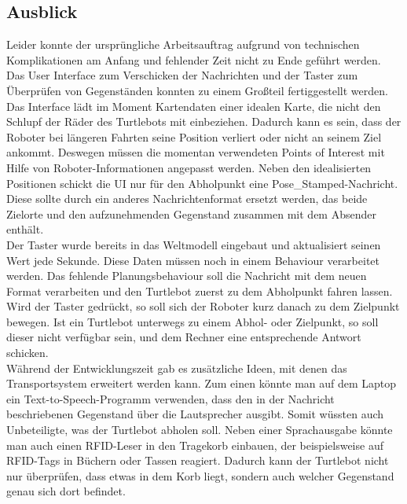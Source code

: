 \documentclass[a4paper,12pt,headsepline]{scrartcl}
\begin{document}
	\subsection{Ausblick}
		Leider konnte der ursprüngliche Arbeitsauftrag aufgrund von technischen Komplikationen am Anfang und fehlender Zeit nicht zu Ende geführt werden. Das User Interface zum Verschicken der Nachrichten und der Taster zum Überprüfen von Gegenständen konnten zu einem Großteil fertiggestellt werden.\\
		Das Interface lädt im Moment Kartendaten einer idealen Karte, die nicht den Schlupf der Räder des Turtlebots mit einbeziehen. Dadurch kann es sein, dass der Roboter bei längeren Fahrten seine Position verliert oder nicht an seinem Ziel ankommt. Deswegen müssen die momentan verwendeten Points of Interest mit Hilfe von Roboter-Informationen angepasst werden. Neben den idealisierten Positionen schickt die UI nur für den Abholpunkt eine \glqq Pose{\_}Stamped\grqq-Nachricht. Diese sollte durch ein anderes Nachrichtenformat ersetzt werden, das beide Zielorte und den aufzunehmenden Gegenstand zusammen mit dem Absender enthält.\\
		Der Taster wurde bereits in das Weltmodell eingebaut und aktualisiert seinen Wert jede Sekunde. Diese Daten müssen noch in einem Behaviour verarbeitet werden. Das fehlende Planungsbehaviour soll die Nachricht mit dem neuen Format verarbeiten und den Turtlebot zuerst zu dem Abholpunkt fahren lassen. Wird der Taster gedrückt, so soll sich der Roboter kurz danach zu dem Zielpunkt bewegen. Ist ein Turtlebot unterwegs zu einem Abhol- oder Zielpunkt, so soll dieser nicht verfügbar sein, und dem Rechner eine entsprechende Antwort schicken.\\
		Während der Entwicklungszeit gab es zusätzliche Ideen, mit denen das Transportsystem erweitert werden kann. Zum einen könnte man auf dem Laptop ein Text-to-Speech-Programm verwenden, dass den in der Nachricht beschriebenen Gegenstand über die Lautsprecher ausgibt. Somit wüssten auch Unbeteiligte, was der Turtlebot abholen soll. Neben einer Sprachausgabe könnte man auch einen RFID-Leser in den Tragekorb einbauen, der beispielsweise auf RFID-Tags in Büchern oder Tassen reagiert. Dadurch kann der Turtlebot nicht nur überprüfen, dass etwas in dem Korb liegt, sondern auch welcher Gegenstand genau sich dort befindet.
		
\end{document}
